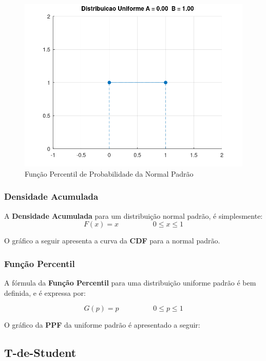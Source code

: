 \documentclass[
]{book}
\begin{document}
\begin{figure}

{\centering \includegraphics[width=0.5\linewidth]{images/uniformepadraopdf} 

}

\caption{Função Percentil de Probabilidade da Normal Padrão}\label{fig:unnamed-chunk-5}
\end{figure}

\hypertarget{densidade-acumulada-1}{%
\subsubsection*{Densidade Acumulada}\label{densidade-acumulada-1}}

A \textbf{Densidade Acumulada} para um distribuição normal padrão, é simplesmente:
\begin{equation}
  F(x) = x \hspace{2cm} 0 \leq x \leq 1
\end{equation}

O gráfico a seguir apresenta a curva da \textbf{CDF} para a normal padrão.

\hypertarget{funuxe7uxe3o-percentil-1}{%
\subsubsection*{Função Percentil}\label{funuxe7uxe3o-percentil-1}}

A fórmula da \textbf{Função Percentil} para uma distribuição uniforme padrão é bem definida, e é expressa por:

\begin{equation}
  G(p) = p \hspace{2cm} 0 \leq p \leq 1
\end{equation}

O gráfico da \textbf{PPF} da uniforme padrão é apresentado a seguir:

\hypertarget{t-de-student}{%
\subsection{T-de-Student}\label{t-de-student}}
\end{document}
